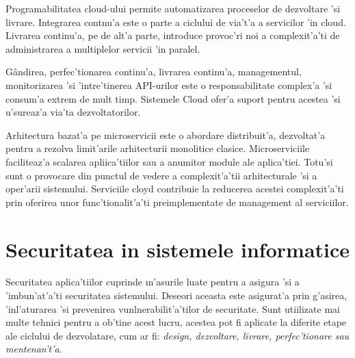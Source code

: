 \documentclass[12pt,a4paper,twoside]{report}
\begin{document}
Programabilitatea cloud-ului permite automatizarea proceselor de dezvoltare 'si livrare.
Integrarea contnu'a este o parte a ciclului de via't'a a servicilor 'in cloud. Livrarea continu'a, pe de alt'a parte, introduce provoc'ri noi a complexit'a'ti de administrarea a multiplelor servicii 'in paralel.

Gândirea, perfec'tionarea continu'a, livrarea continu'a, managementul, monitorizarea 'si 'intre'tinerea API-urilor este o responsabilitate complex'a 'si consum'a extrem de mult timp. Sistemele Cloud ofer'a suport pentru acestea 'si u'sureaz'a via'ta dezvoltatorilor.

Arhitectura bazat'a pe microservicii este o abordare distribuit'a, dezvoltat'a pentru a rezolva limit'arile arhitecturii monolitice clasice. Microserviciile faciliteaz'a scalarea apliica'tiilor sau a anumitor module ale aplica'tiei. Totu'si sunt o provocare din punctul de vedere a complexit'a'tii arhitecturale 'si a oper'arii sistemului. Serviciile cloyd contribuie la reducerea acestei complexit'a'ti prin oferirea unor func'tionalit'a'ti preimplementate de management al serviciilor.

\section{Securitatea in sistemele informatice}

Securitatea aplica'tiilor cuprinde m'asurile luate pentru a asigura 'si a 'imbun'at'a'ti securitatea sistemului. Deseori aceasta este asigurat'a prin g'asirea, 'inl'aturarea 'si prevenirea vunlnerabilit'a'tilor de securitate. Sunt utiilizate mai multe tehnici pentru a ob'tine acest lucru, acestea pot fi aplicate la diferite etape ale ciclului de dezvolatare, cum ar fi: \textit{design, dezvoltare, livrare, perfec'tionare sau mentenan't'a}.
\end{document}
